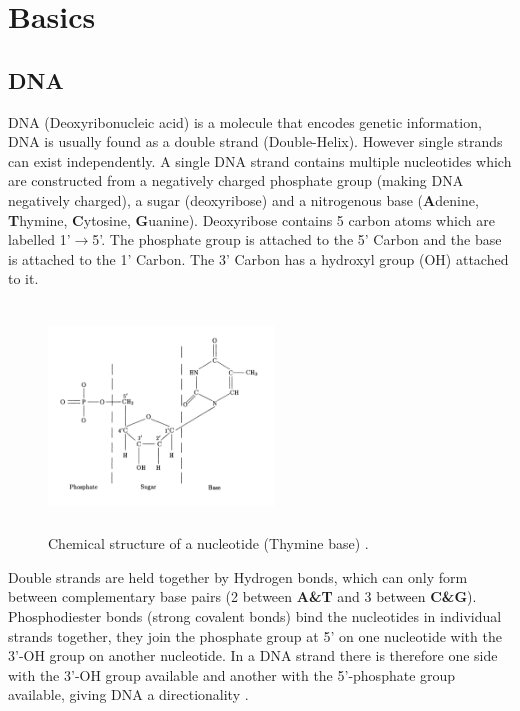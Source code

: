 \documentclass[11pt,a4paper,portrait]{article}
\begin{document}
\section{Basics}
\subsection{DNA}
DNA (Deoxyribonucleic acid) is a molecule that encodes genetic information, DNA is usually found as a double strand (Double-Helix). However single strands can exist independently. A single DNA strand contains multiple nucleotides which are constructed from a negatively charged phosphate group (making DNA negatively charged), a sugar (deoxyribose) and a nitrogenous base (\textbf{A}denine, \textbf{T}hymine, \textbf{C}ytosine, \textbf{G}uanine). Deoxyribose contains 5 carbon atoms which are labelled 1'$\rightarrow$5'. The phosphate group is attached to the 5' Carbon and the base is attached to the 1' Carbon. The 3' Carbon has a hydroxyl group (OH) attached to it. 

\begin{figure}[ht!]
\centering
\includegraphics[width=60mm, height=60mm]{nucleotide.png}
\caption{Chemical structure of a nucleotide (Thymine base) \cite{paun2013DNA}. \label{nucleotide}}
\end{figure}

Double strands are held together by Hydrogen bonds, which can only form between complementary base pairs (2 between \textbf{A\&T} and 3 between \textbf{C\&G}). Phosphodiester bonds (strong covalent bonds) bind the nucleotides in individual strands together, they join the phosphate group at 5' on one nucleotide with the 3'-OH group on another nucleotide. In a DNA strand there is therefore one side with the 3'-OH group available and another with the 5'-phosphate group available, giving DNA a directionality \cite{paun2013DNA}. 
\end{document}
